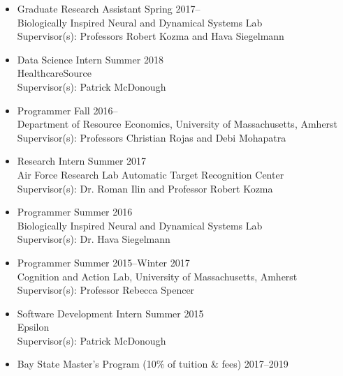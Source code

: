 \documentclass[11pt]{article}
\renewcommand{\section}[1]
{\vspace{1.0\baselineskip}{\Large\textbf{#1}}}
\begin{document}
\begin{itemize}[leftmargin=12pt]
  \item[] Graduate Research Assistant \hfill Spring 2017-- \\
  Biologically Inspired Neural and Dynamical Systems Lab \\
  Supervisor(s): Professors Robert Kozma and Hava Siegelmann
  \item[] Data Science Intern \hfill Summer 2018 \\
  HealthcareSource \\
  Supervisor(s): Patrick McDonough
  \item[] Programmer \hfill Fall 2016-- \\
  Department of Resource Economics, University of Massachusetts, Amherst \\
  Supervisor(s): Professors Christian Rojas and Debi Mohapatra
  \item[] Research Intern \hfill Summer 2017 \\
  Air Force Research Lab Automatic Target Recognition Center \\
  Supervisor(s): Dr. Roman Ilin and Professor Robert Kozma\
  \item[] Programmer \hfill Summer 2016 \\
  Biologically Inspired Neural and Dynamical Systems Lab \\
  Supervisor(s): Dr. Hava Siegelmann
  \item[] Programmer \hfill Summer 2015--Winter 2017 \\
  Cognition and Action Lab, University of Massachusetts, Amherst \\
  Supervisor(s): Professor Rebecca Spencer
  \item[] Software Development Intern \hfill Summer 2015 \\
  Epsilon \\
  Supervisor(s): Patrick McDonough
\end{itemize}

\section{Awards}

\begin{itemize}[leftmargin=12pt]
  \item[] Bay State Master's Program (10\% of tuition \& fees) \hfill 2017--2019
\end{itemize}

\section{Publications}
\end{document}
